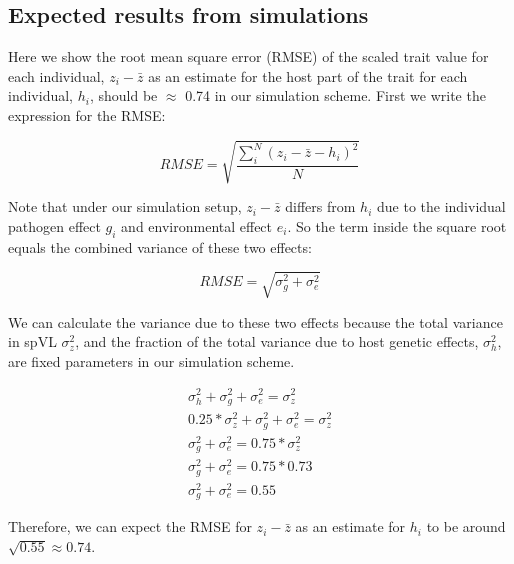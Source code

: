 \documentclass[11pt]{article}
\begin{document}
\begin{doublespace}

\subsection*{Expected results from simulations}

Here we show the root mean square error (RMSE) of the scaled trait value for each individual, $z_i - \bar{z}$ as an estimate for the host part of the trait for each individual, ${h_i}$, should be $\approx$ 0.74 in our simulation scheme. First we write the expression for the RMSE:

\begin{equation}
    RMSE = \sqrt{\frac{\sum_i^N(z_i - \bar{z} - h_i)^2}{N}}
\end{equation}

Note that under our simulation setup, $z_i - \bar{z}$ differs from $h_i$ due to the individual pathogen effect $g_i$ and environmental effect $e_i$. So the term inside the square root equals the combined variance of these two effects:

\begin{equation}
    RMSE = \sqrt{\sigma^2_{g} + \sigma^2_e}
\end{equation}

We can calculate the variance due to these two effects because the total variance in spVL $\sigma^2_z$, and the fraction of the total variance due to host genetic effects, $\sigma^2_{h}$, are fixed parameters in our simulation scheme.

\begin{equation}
\begin{split}
    \sigma^2_{h} + \sigma^2_{g} + \sigma^2_e = \sigma^2_z \\
    0.25 * \sigma^2_{z} + \sigma^2_{g} + \sigma^2_e = \sigma^2_z \\
    \sigma^2_{g} + \sigma^2_e = 0.75 * \sigma^2_z \\
    \sigma^2_{g} + \sigma^2_e = 0.75 * 0.73 \\
    \sigma^2_{g} + \sigma^2_e = 0.55
\end{split}
\end{equation}

Therefore, we can expect the RMSE for $z_i - \bar{z}$ as an estimate for ${h_i}$ to be around $\sqrt{0.55} \approx 0.74$. 

\newpage


\end{doublespace}
\end{document}
